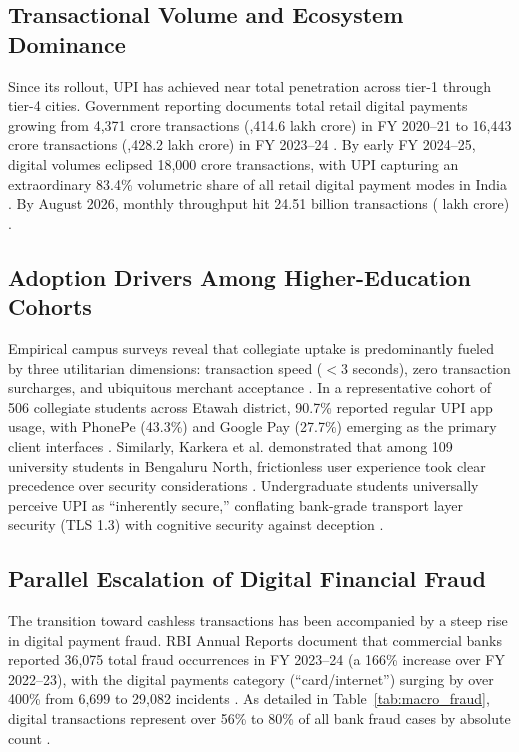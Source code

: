 \documentclass[journal,10pt,twocolumn]{IEEEtran}
\begin{document}
\subsection{Transactional Volume and Ecosystem Dominance}
Since its rollout, UPI has achieved near total penetration across tier-1 through tier-4 cities. Government reporting documents total retail digital payments growing from 4,371 crore transactions (,414.6 lakh crore) in FY 2020--21 to 16,443 crore transactions (,428.2 lakh crore) in FY 2023--24 \cite{bs_vol2025, pib_surge2025}. By early FY 2024--25, digital volumes eclipsed 18,000 crore transactions, with UPI capturing an extraordinary 83.4\% volumetric share of all retail digital payment modes in India \cite{bs_vol2025, pib_surge2025}. By August 2026, monthly throughput hit 24.51 billion transactions ( lakh crore) \cite{bs_record2026}.

\subsection{Adoption Drivers Among Higher-Education Cohorts}
Empirical campus surveys reveal that collegiate uptake is predominantly fueled by three utilitarian dimensions: transaction speed ($<3$ seconds), zero transaction surcharges, and ubiquitous merchant acceptance \cite{karkera2024, roy2026}. In a representative cohort of 506 collegiate students across Etawah district, 90.7\% reported regular UPI app usage, with PhonePe (43.3\%) and Google Pay (27.7\%) emerging as the primary client interfaces \cite{exploratio2026}. Similarly, Karkera et al. demonstrated that among 109 university students in Bengaluru North, frictionless user experience took clear precedence over security considerations \cite{karkera2024}. Undergraduate students universally perceive UPI as ``inherently secure,'' conflating bank-grade transport layer security (TLS 1.3) with cognitive security against deception \cite{exploratio2026, sharma2024}.

\subsection{Parallel Escalation of Digital Financial Fraud}
The transition toward cashless transactions has been accompanied by a steep rise in digital payment fraud. RBI Annual Reports document that commercial banks reported 36,075 total fraud occurrences in FY 2023--24 (a 166\% increase over FY 2022--23), with the digital payments category (``card/internet'') surging by over 400\% from 6,699 to 29,082 incidents \cite{bloomberg2024, bs_frauds2024}. As detailed in Table~\ref{tab:macro_fraud}, digital transactions represent over 56\% to 80\% of all bank fraud cases by absolute count \cite{bs_frauds2024, bs_cases2025}.
\end{document}
